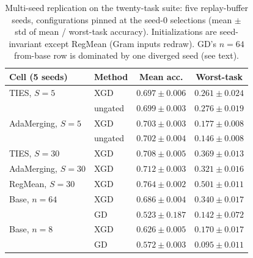 \documentclass{article} %
\begin{document}
\iffalse
\begin{table}[t]
\centering
\small
\setlength{\tabcolsep}{5pt}
\caption{Multi-seed replication on the twenty-task suite: five replay-buffer seeds, configurations pinned at the seed-$0$ selections (mean $\pm$ std of mean / worst-task accuracy). Initializations are seed-invariant except RegMean (Gram inputs redraw). GD's $n{=}64$ from-base row is dominated by one diverged seed (see text).}
\label{tab:clip20seeds}
\footnotesize
\begin{tabular}{llcc}
\toprule
Cell (5 seeds) & Method & Mean acc. & Worst-task \\
\midrule
TIES, $S{=}5$        & XGD      & $0.697\pm0.006$ & $0.261\pm0.024$ \\
                     & ungated  & $0.699\pm0.003$ & $0.276\pm0.019$ \\
AdaMerging, $S{=}5$  & XGD      & $0.703\pm0.003$ & $0.177\pm0.008$ \\
                     & ungated  & $0.702\pm0.004$ & $0.146\pm0.008$ \\
\midrule
TIES, $S{=}30$       & XGD      & $0.708\pm0.005$ & $0.369\pm0.013$ \\
AdaMerging, $S{=}30$ & XGD      & $0.712\pm0.003$ & $0.321\pm0.016$ \\
RegMean, $S{=}30$    & XGD      & $0.764\pm0.002$ & $0.501\pm0.011$ \\
\midrule
Base, $n{=}64$       & XGD      & $0.686\pm0.004$ & $0.340\pm0.017$ \\
                     & GD       & $0.523\pm0.187$ & $0.142\pm0.072$ \\
Base, $n{=}8$        & XGD      & $0.626\pm0.005$ & $0.170\pm0.017$ \\
                     & GD       & $0.572\pm0.003$ & $0.095\pm0.011$ \\
\bottomrule
\end{tabular}
\end{table}
\end{document}

